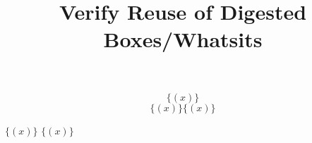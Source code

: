 \documentclass{article}
\title{Verify Reuse of Digested Boxes/Whatsits}
\def\brackets#1{\{#1\}}
\def\parens#1{(#1)}
\def\BoxDup#1{#1#1}
\def\SaveBox#1{\def\mysavedbox{#1}#1}
\def\UseBox{\mysavedbox}
\begin{document}
\[ \brackets{\parens{x}} \]
\[ \BoxDup{\brackets{\parens{x}}} \]

\SaveBox{$\brackets{\parens{x}}$}
\UseBox
\end{document}
